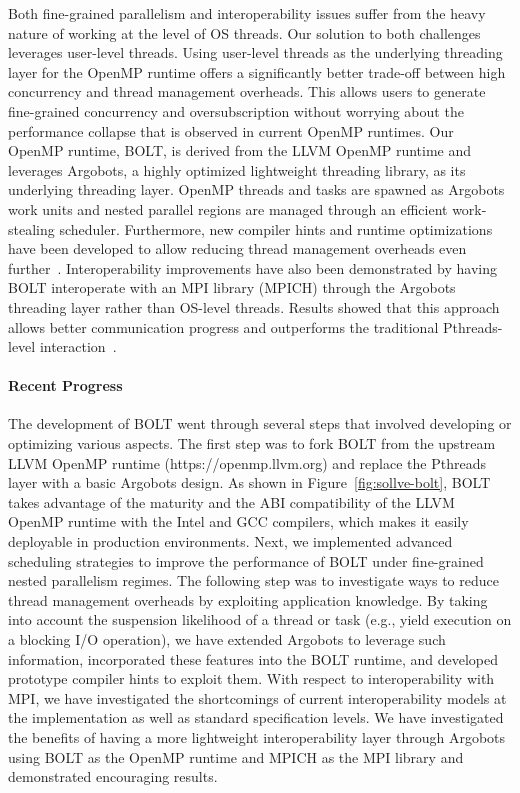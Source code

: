 Both fine-grained parallelism and interoperability issues suffer from
the heavy nature of working at the level of OS threads.  Our solution
to both challenges leverages user-level threads.  Using user-level
threads as the underlying threading layer for the OpenMP runtime
offers a significantly better trade-off between high concurrency and
thread management overheads.  This allows users to generate
fine-grained concurrency and oversubscription without worrying about
the performance collapse that is observed in current OpenMP runtimes.
Our OpenMP runtime, BOLT, is derived from the LLVM OpenMP runtime and
leverages Argobots, a highly optimized lightweight threading library,
as its underlying threading layer.  OpenMP threads and tasks are
spawned as Argobots work units and nested parallel regions are managed
through an efficient work-stealing scheduler.  Furthermore, new
compiler hints and runtime optimizations have been developed to allow
reducing thread management overheads even further~\cite{iwasaki2018}.
Interoperability improvements have also been demonstrated by having
BOLT interoperate with an MPI library (MPICH) through the Argobots
threading layer rather than OS-level threads.  Results showed that
this approach allows better communication progress and outperforms the
traditional Pthreads-level interaction~\cite{seo2018}.

\paragraph{Recent Progress}

The development of BOLT went through several steps that involved
developing or optimizing various aspects.  The first step was to fork
BOLT from the upstream LLVM OpenMP runtime (https://openmp.llvm.org)
and replace the Pthreads layer with a basic Argobots design. As shown
in Figure~\ref{fig:sollve-bolt}, BOLT takes advantage of the maturity
and the ABI compatibility of the LLVM OpenMP runtime with the Intel
and GCC compilers, which makes it easily deployable in production
environments.  Next, we implemented advanced scheduling strategies to
improve the performance of BOLT under fine-grained nested parallelism
regimes.  The following step was to investigate ways to reduce thread
management overheads by exploiting application knowledge.  By taking
into account the suspension likelihood of a thread or task (e.g.,
yield execution on a blocking I/O operation), we have extended
Argobots to leverage such information, incorporated these features
into the BOLT runtime, and developed prototype compiler hints to
exploit them. With respect to interoperability with MPI, we have
investigated the shortcomings of current interoperability models at
the implementation as well as standard specification levels.  We have
investigated the benefits of having a more lightweight
interoperability layer through Argobots using BOLT as the OpenMP
runtime and MPICH as the MPI library and demonstrated encouraging
results.

